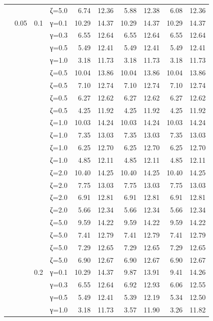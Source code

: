 \begin{table}[htbp]
\begin{tabular}{ll r l  rr  rr  rr}
  &  &  & ζ=5.0 & 6.74 & 12.36 & 5.88 & 12.38 & 6.08 & 12.36 \\
  & 0.05 & 0.1 & γ=0.1 & 10.29 & 14.37 & 10.29 & 14.37 & 10.29 & 14.37 \\
  &  &  & γ=0.3 & 6.55 & 12.64 & 6.55 & 12.64 & 6.55 & 12.64 \\
  &  &  & γ=0.5 & 5.49 & 12.41 & 5.49 & 12.41 & 5.49 & 12.41 \\
  &  &  & γ=1.0 & 3.18 & 11.73 & 3.18 & 11.73 & 3.18 & 11.73 \\
  &  &  & ζ=0.5 & 10.04 & 13.86 & 10.04 & 13.86 & 10.04 & 13.86 \\
  &  &  & ζ=0.5 & 7.10 & 12.74 & 7.10 & 12.74 & 7.10 & 12.74 \\
  &  &  & ζ=0.5 & 6.27 & 12.62 & 6.27 & 12.62 & 6.27 & 12.62 \\
  &  &  & ζ=0.5 & 4.25 & 11.92 & 4.25 & 11.92 & 4.25 & 11.92 \\
  &  &  & ζ=1.0 & 10.03 & 14.24 & 10.03 & 14.24 & 10.03 & 14.24 \\
  &  &  & ζ=1.0 & 7.35 & 13.03 & 7.35 & 13.03 & 7.35 & 13.03 \\
  &  &  & ζ=1.0 & 6.25 & 12.70 & 6.25 & 12.70 & 6.25 & 12.70 \\
  &  &  & ζ=1.0 & 4.85 & 12.11 & 4.85 & 12.11 & 4.85 & 12.11 \\
  &  &  & ζ=2.0 & 10.40 & 14.25 & 10.40 & 14.25 & 10.40 & 14.25 \\
  &  &  & ζ=2.0 & 7.75 & 13.03 & 7.75 & 13.03 & 7.75 & 13.03 \\
  &  &  & ζ=2.0 & 6.91 & 12.81 & 6.91 & 12.81 & 6.91 & 12.81 \\
  &  &  & ζ=2.0 & 5.66 & 12.34 & 5.66 & 12.34 & 5.66 & 12.34 \\
  &  &  & ζ=5.0 & 9.59 & 14.22 & 9.59 & 14.22 & 9.59 & 14.22 \\
  &  &  & ζ=5.0 & 7.41 & 12.79 & 7.41 & 12.79 & 7.41 & 12.79 \\
  &  &  & ζ=5.0 & 7.29 & 12.65 & 7.29 & 12.65 & 7.29 & 12.65 \\
  &  &  & ζ=5.0 & 6.90 & 12.67 & 6.90 & 12.67 & 6.90 & 12.67 \\
  &  & 0.2 & γ=0.1 & 10.29 & 14.37 & 9.87 & 13.91 & 9.41 & 14.26 \\
  &  &  & γ=0.3 & 6.55 & 12.64 & 6.92 & 12.93 & 6.06 & 12.55 \\
  &  &  & γ=0.5 & 5.49 & 12.41 & 5.39 & 12.19 & 5.34 & 12.50 \\
  &  &  & γ=1.0 & 3.18 & 11.73 & 3.57 & 11.90 & 3.26 & 11.82 \\

\end{tabular}
\end{table}
